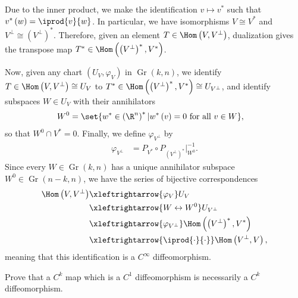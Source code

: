 \documentclass[10pt]{mypackage}
\begin{document}
\begin{solution}
  Due to the inner product, we make the identification $v\mapsto v^{\ast}$ such that $v^{\ast}\left( w \right) = \iprod{v}{w}$. In particular, we have isomorphisms $V\cong V^{\ast}$ and $V^{\perp}\cong \left( V^{\perp} \right)^{\ast}$. Therefore, given an element $T\in \Hom\left( V,V^{\perp} \right)$, dualization gives the transpose map $T^{\ast}\in \Hom\left( \left( V^{\perp} \right)^{\ast},V^{\ast} \right)$.\newline

  Now, given any chart $\left( U_V,\varphi_V \right)$ in $\operatorname{Gr}\left( k,n \right)$, we identify $T\in \Hom\left( V,V^{\perp} \right)\cong U_{V}$ to $T^{\ast}\in \Hom\left( \left( V^{\perp} \right)^{\ast},V^{\ast} \right) \cong U_{V^{\perp}}$, and identify subspaces $W\in U_{V}$ with their annihilators 
  \begin{align*}
    W^{0} &= \set{w^{\ast}\in \left( \R^n \right)^{\ast} | w^{\ast}\left( v \right) = 0\text{ for all }v\in W},
  \end{align*}
  so that $W^{0}\cap V^{\ast} = 0$. Finally, we define $\varphi_{V^{\perp}}$ by
  \begin{align*}
    \varphi_{V^{\perp}} &= P_{V^{\ast}}\circ P_{\left( V^{\perp} \right)^{\ast}}|_{W^{0}}^{-1}.
  \end{align*}
  Since every $W\in \operatorname{Gr}\left( k,n \right)$ has a unique annihilator subspace $W^{0}\in \operatorname{Gr}\left( n-k,n \right)$, we have the series of bijective correspondences
  \begin{align*}
    \Hom\left( V,V^{\perp} \right) &\xleftrightarrow{\varphi_{V}} U_{V}\\
                                   &\xleftrightarrow{W\leftrightarrow W^{0}} U_{V^{\perp}}\\
                                   &\xleftrightarrow{\varphi_{V^{\perp}}} \Hom\left( \left( V^{\perp} \right)^{\ast},V^{\ast} \right)\\
                                   &\xleftrightarrow{ \iprod{\cdot}{\cdot} } \Hom\left( V^{\perp},V \right),
  \end{align*}
  meaning that this identification is a $C^{\infty}$ diffeomorphism.
\end{solution}
\begin{problem}[Problem 3]
  Prove that a $C^{k}$ map which is a $C^{1}$ diffeomorphism is necessarily a $C^{k}$ diffeomorphism.
\end{problem}
\end{document}
